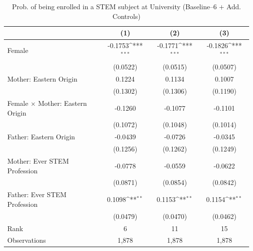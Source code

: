 \documentclass[a4paper, oneside, hyperfootnotes = false]{article}
\def\sym#1{\ifmmode^{#1}\else\(^{#1}\)\fi}
\begin{document}
{\begin{table}[ht]
	\caption[STEM subject at University (Baseline--6 + Add. Controls)]{Prob. of being enrolled in a STEM subject at University (Baseline--6 $+$ Add. Controls)}
	\label{tab:baseline--6_controls}
	\begin{center}
		\begin{tabular}{l*{3}{c}}
			\toprule
			&\multicolumn{1}{c}{(1)}         &\multicolumn{1}{c}{(2)}         &\multicolumn{1}{c}{(3)}         \\
			\midrule
			Female              &     -0.1753\sym{***}&     -0.1771\sym{***}&     -0.1826\sym{***}\\
			&    (0.0522)         &    (0.0515)         &    (0.0507)         \\
			\addlinespace
			Mother: Eastern Origin&      0.1224         &      0.1134         &      0.1007         \\
			&    (0.1302)         &    (0.1306)         &    (0.1190)         \\
			\addlinespace
			Female $\times$ Mother: Eastern Origin&     -0.1260         &     -0.1077         &     -0.1101         \\
			&    (0.1072)         &    (0.1048)         &    (0.1014)         \\
			\addlinespace
			Father: Eastern Origin&     -0.0439         &     -0.0726         &     -0.0345         \\
			&    (0.1256)         &    (0.1262)         &    (0.1249)         \\
			\addlinespace
			Mother: Ever STEM Profession&     -0.0778         &     -0.0559         &     -0.0622         \\
			&    (0.0871)         &    (0.0854)         &    (0.0842)         \\
			\addlinespace
			Father: Ever STEM Profession&      0.1098\sym{**} &      0.1153\sym{**} &      0.1154\sym{**} \\
			&    (0.0479)         &    (0.0470)         &    (0.0462)         \\
			\midrule
			Rank                &      6         &     11         &     15         \\
			Observations                   &   1,878         &   1,878         &   1,878         \\
			\bottomrule
		\end{tabular}
		
		\vspace{2mm}
		

\end{center}
\end{table}}
\end{document}
